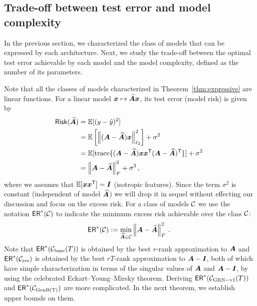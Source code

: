 \subsection{Trade-off between test error and model complexity} In the previous section, we characterized the class of models that can be expressed by each architecture. Next, we study the trade-off between the optimal test error achievable by each model and the model complexity, defined as the number of its parameters.

Note that all the classes of models characterized in Theorem~\ref{thm:expressive} are linear functions. For a linear model $\bm{x}\mapsto \widehat{\bm{A}}\bm{x}$, its test error (model risk) is given by
\begin{align*}
{\sf Risk}(\widehat{\bm{A}}) &= \operatorname{\mathbb{E}}[(y-\hat{y})^2]\\
&= \operatorname{\mathbb{E}}\left[\left\|({\bm{A}}-\widehat{\bm{A}})\bm{x}\right\|_{\ell_2}^2\right] + \sigma^2\\
&= \operatorname{\mathbb{E}}[{{\operatorname{trace}}}{\{({\bm{A}}-\widehat{\bm{A}})\bm{x} \bm{x}^{\sf T}({\bm{A}}-\widehat{\bm{A}})^{\sf T}\}}]+ \sigma^2\\
&= \left\|{\bm{A}}-\widehat{\bm{A}}\right\|_{F}^2+ \sigma^2\,,
\end{align*}
where we assumes that $\operatorname{\mathbb{E}}[\bm{x}\bm{x}^{\sf T}] = \bm{I}$ (isotropic features). Since the term $\sigma^2$ is constant (independent of model $\widehat{\bm{A}}$) we will drop it in sequel without effecting our discussion and focus on the excess risk.
For a class of models $\mathcal{C}$ we use the notation ${\sf ER}^*(\mathcal{C})$ to indicate the minimum excess risk achievable over the class $\mathcal{C}$:
%
\[
{\sf ER}^*(\mathcal{C}): = \min_{\widehat{\bm{A}}\in\mathcal{C}} \left\|{\bm{A}}-\widehat{\bm{A}}\right\|_{F}^2\,.
\]
%
Note that ${\sf ER}^*(\mathcal{C}_{\rm base}(T))$ is obtained by the best $r$-rank  approximation to ${\bm{A}}$ and ${\sf ER}^*(\mathcal{C}_{\rm res})$ is obtained by the best $rT$-rank approximation to ${\bm{A}}-\bm{I}$, both of which have simple characterization in terms of the singular values of ${\bm{A}}$ and ${\bm{A}}-\bm{I}$, by using the celebrated Eckart–Young–Mirsky theorem.
Deriving ${\sf ER}^*(\mathcal{C}_{\rm GRN-v1{}}(T))$ and ${\sf ER}^*(\mathcal{C}_{\rm GenB{}(T)})$ are more complicated. In the next theorem, we establish upper bounds on them.

